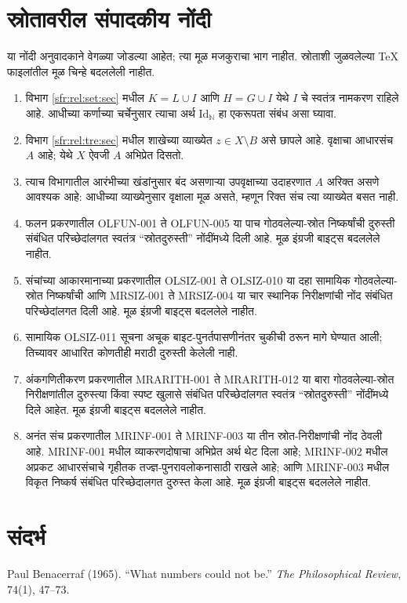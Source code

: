 \documentclass[11pt,a4paper,openany]{book}
\theoremstyle{definition}
\newcommand{\Nat}{\mathbb{N}}
\newcommand{\Id}[1]{\mathord{\mathrm{Id}_{#1}}}
\begin{document}
\chapter*{स्रोतावरील संपादकीय नोंदी}
या नोंदी अनुवादकाने वेगळ्या जोडल्या आहेत; त्या मूळ मजकुराचा भाग नाहीत.
स्रोताशी जुळवलेल्या TeX फाइलांतील मूळ चिन्हे बदललेली नाहीत.
\begin{enumerate}
\item विभाग \ref{sfr:rel:set:sec} मधील $K=L\cup I$ आणि $H=G\cup I$ येथे
$I$ चे स्वतंत्र नामकरण राहिले आहे. आधीच्या कर्णाच्या चर्चेनुसार त्याचा अर्थ
$\Id{\Nat}$ हा एकरूपता संबंध असा घ्यावा.
\item विभाग \ref{sfr:rel:tre:sec} मधील शाखेच्या व्याख्येत $z\in X\setminus B$
असे छापले आहे. वृक्षाचा आधारसंच $A$ आहे; येथे $X$ ऐवजी $A$ अभिप्रेत दिसतो.
\item त्याच विभागातील आरंभीच्या खंडांनुसार बंद असणाऱ्या उपवृक्षाच्या उदाहरणात
$A$ अरिक्त असणे आवश्यक आहे: आधीच्या व्याख्येनुसार वृक्षाला मूळ असते,
म्हणून रिक्त संच त्या व्याख्येत बसत नाही.
\item फलन प्रकरणातील OLFUN-001 ते OLFUN-005 या पाच
गोठवलेल्या-स्रोत निष्कर्षांची दुरुस्ती संबंधित परिच्छेदांलगत स्वतंत्र
``स्रोतदुरुस्ती'' नोंदींमध्ये दिली आहे. मूळ इंग्रजी बाइट्स बदललेले नाहीत.
\item संचांच्या आकारमानाच्या प्रकरणातील OLSIZ-001 ते OLSIZ-010
या दहा सामायिक गोठवलेल्या-स्रोत निष्कर्षांची आणि MRSIZ-001 ते MRSIZ-004
या चार स्थानिक निरीक्षणांची नोंद संबंधित परिच्छेदांलगत दिली आहे. मूळ
इंग्रजी बाइट्स बदललेले नाहीत.
\item सामायिक OLSIZ-011 सूचना अचूक बाइट-पुनर्तपासणीनंतर चुकीची ठरून
मागे घेण्यात आली; तिच्यावर आधारित कोणतीही मराठी दुरुस्ती केलेली नाही.
\item अंकगणितीकरण प्रकरणातील MRARITH-001 ते MRARITH-012 या बारा
गोठवलेल्या-स्रोत निरीक्षणांतील दुरुस्त्या किंवा स्पष्ट खुलासे संबंधित
परिच्छेदांलगत स्वतंत्र ``स्रोतदुरुस्ती'' नोंदींमध्ये दिले आहेत. मूळ
इंग्रजी बाइट्स बदललेले नाहीत.
\item अनंत संच प्रकरणातील MRINF-001 ते MRINF-003 या तीन स्रोत-निरीक्षणांची
नोंद ठेवली आहे. MRINF-001 मधील व्याकरणदोषाचा अभिप्रेत अर्थ थेट दिला आहे;
MRINF-002 मधील अप्रकट आधारसंचाचे गृहीतक तज्ज्ञ-पुनरावलोकनासाठी राखले आहे;
आणि MRINF-003 मधील विकृत निष्कर्ष संबंधित परिच्छेदालगत दुरुस्त केला आहे.
मूळ इंग्रजी बाइट्स बदललेले नाहीत.
\end{enumerate}
\chapter*{संदर्भ}
\label{bib:Benacerraf1965}
Paul Benacerraf (1965). ``What numbers could not be.''
\textit{The Philosophical Review}, 74(1), 47--73.
\end{document}
